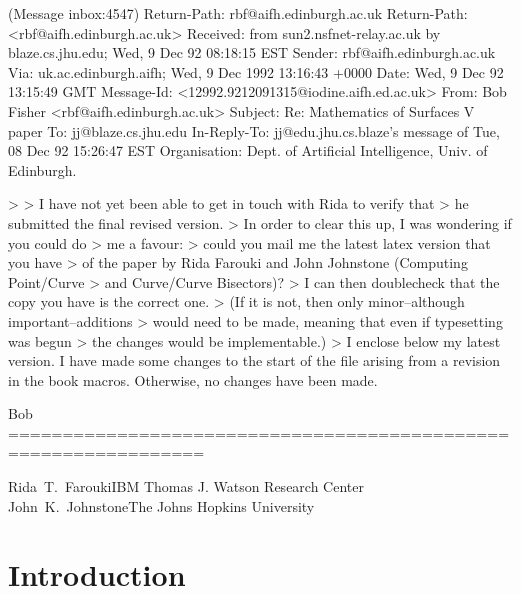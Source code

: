 (Message inbox:4547)
Return-Path: rbf@aifh.edinburgh.ac.uk
Return-Path: <rbf@aifh.edinburgh.ac.uk>
Received: from sun2.nsfnet-relay.ac.uk
           by blaze.cs.jhu.edu; Wed, 9 Dec 92 08:18:15 EST
Sender: rbf@aifh.edinburgh.ac.uk
Via: uk.ac.edinburgh.aifh; Wed, 9 Dec 1992 13:16:43 +0000
Date: Wed, 9 Dec 92 13:15:49 GMT
Message-Id: <12992.9212091315@iodine.aifh.ed.ac.uk>
From: Bob Fisher <rbf@aifh.edinburgh.ac.uk>
Subject: Re: Mathematics of Surfaces V paper
To: jj@blaze.cs.jhu.edu
In-Reply-To: jj@edu.jhu.cs.blaze's message of Tue, 08 Dec 92 15:26:47 EST
Organisation: Dept. of Artificial Intelligence, Univ. of Edinburgh.

> 
> I have not yet been able to get in touch with Rida to verify that
> he submitted the final revised version.
> In order to clear this up, I was wondering if you could do
> me a favour:
> could you mail me the latest latex version that you have
> of the paper by Rida Farouki and John Johnstone (Computing Point/Curve
> and Curve/Curve Bisectors)?
> I can then doublecheck that the copy you have is the correct one.
> (If it is not, then only minor--although important--additions 
> would need to be made, meaning that even if typesetting was begun
> the changes would be implementable.)
> 
I enclose below my latest version. I have made some changes to the
start of the file arising from a revision in the book macros.
Otherwise, no changes have been made.

Bob
================================================================


\def\rd{{\rm d}}
\def\re{{\rm e}}
\def\ri{{\rm i}}
\def\ldash{\vrule height 3pt width 0.35in depth -2.5pt}
\newcommand{\half}{\textstyle{1 \over 2}\displaystyle}
\newcommand{\prf}{\noindent{{\bf Proof} :\ }}
\newcommand{\QED}{\vrule height 1.4ex width 1.0ex depth -.1ex\ \medskip}

\newtheorem{dfn}{Definition}[section]
\newtheorem{rmk}{Remark}[section]
\newtheorem{lma}{Lemma}[section]
\newtheorem{propn}{Proposition}[section]
\newtheorem{exmpl}{Example}[section]
\newtheorem{thm}{Theorem}[section]
\newtheorem{crlry}{Corollary}[section]

{Rida~T.~Farouki}{IBM Thomas J. Watson Research Center}
{John~K.~Johnstone}{The Johns Hopkins University}

\section{Introduction}

